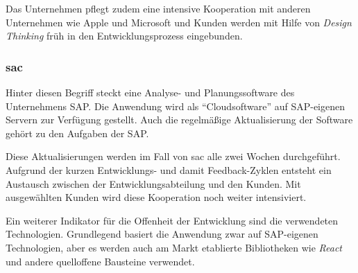 Das Unternehmen pflegt zudem eine intensive Kooperation mit anderen Unternehmen
wie Apple \cite{Appleund81:online} und Microsoft \cite{Microsof58:online} und
Kunden werden mit Hilfe von \textit{Design Thinking} \cite{SAPDesig64:online} früh in den Entwicklungsprozess eingebunden.



\subsubsection{\ac{sac}}\label{sec:beispiele-sap-sac}
Hinter diesen Begriff steckt eine Analyse- und Planungssoftware des Unternehmens SAP.
Die Anwendung wird als \enquote{Cloudsoftware} auf SAP-eigenen Servern zur Verfügung gestellt.
Auch die regelmäßige Aktualisierung der Software gehört zu den Aufgaben der SAP.

Diese Aktualisierungen werden im Fall von \ac{sac} alle zwei Wochen durchgeführt.
Aufgrund der kurzen Entwicklungs- und damit Feedback-Zyklen entsteht ein Austausch zwischen der Entwicklungsabteilung und den Kunden.
Mit ausgewählten Kunden wird diese Kooperation noch weiter intensiviert.

Ein weiterer Indikator für die Offenheit der Entwicklung sind die verwendeten Technologien.
Grundlegend basiert die Anwendung zwar auf SAP-eigenen Technologien,
aber es werden auch am Markt etablierte Bibliotheken wie \textit{React} und andere quelloffene Bausteine verwendet.
